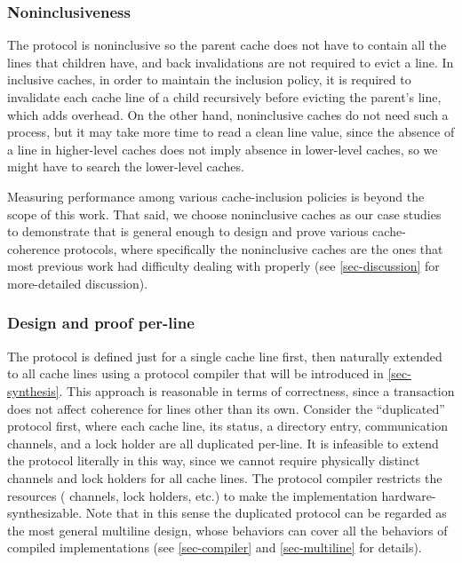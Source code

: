 \documentclass[sigplan,10pt,review,anonymous,screen]{acmart}\settopmatter{printfolios=true,printccs=false,printacmref=false}
\begin{document}
\subsubsection{Noninclusiveness}

The protocol is noninclusive so the parent cache does not have to contain all the lines that children have, and back invalidations are not required to evict a line.
In inclusive caches, in order to maintain the inclusion policy, it is required to invalidate each cache line of a child recursively before evicting the parent's line, which adds overhead.
On the other hand, noninclusive caches do not need such a process, but it may take more time to read a clean line value, since the absence of a line in higher-level caches does not imply absence in lower-level caches, so we might have to search the lower-level caches.

Measuring performance among various cache-inclusion policies is beyond the scope of this work.
That said, we choose noninclusive caches as our case studies to demonstrate that \hemiola{} is general enough to design and prove various cache-coherence protocols, where specifically the noninclusive caches are the ones that most previous work had difficulty dealing with properly (see \autoref{sec-discussion} for more-detailed discussion).

\subsubsection{Design and proof per-line}
\label{sec-design-line}

The protocol is defined just for a single cache line first, then naturally extended to all cache lines using a protocol compiler that will be introduced in \autoref{sec-synthesis}.
This approach is reasonable in terms of correctness, since a transaction does not affect coherence for lines other than its own.
Consider the ``duplicated'' protocol first, where each cache line, its status, a directory entry, communication channels, and a lock holder are all duplicated per-line.
It is infeasible to extend the protocol literally in this way, since we cannot require physically distinct channels and lock holders for all cache lines.
The protocol compiler restricts the resources (\eg{} channels, lock holders, etc.) to make the implementation hardware-synthesizable.
Note that in this sense the duplicated protocol can be regarded as the most general multiline design, whose behaviors can cover all the behaviors of compiled implementations (see \autoref{sec-compiler} and \autoref{sec-multiline} for details).
\end{document}
